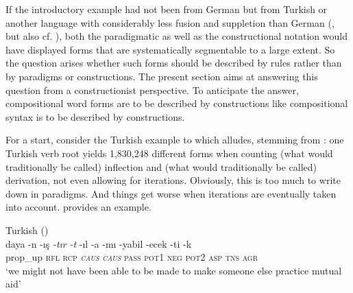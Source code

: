 \documentclass[output=paper]{langsci/langscibook}
\begin{document}
If the introductory example had not been from German but from Turkish or another language with considerably less fusion and suppletion than German (\citealt[4]{AikhenvaldDixon2017}, \citealt[334]{Dressler1985} but also cf. \citealt{Bacanlı2011}), both the paradigmatic as well as the constructional notation would have displayed forms that are systematically segmentable to a large extent. So the question arises whether such forms should be described by rules rather than by paradigms or constructions. The present section aims at answering this question from a constructionist perspective. To anticipate the answer, compositional word forms are to be described by constructions like compositional syntax is to be described by constructions.

\begin{sloppypar}
For a start, consider the Turkish example to which \citet[59]{Haspelmath2011} alludes, stemming from \citet[403]{Hankamer1989}: one Turkish verb root yields 1,830,248 different forms when counting (what would traditionally be called) inflection and (what would traditionally be called) derivation, not even allowing for iterations. Obviously, this is too much to write down in paradigms. And things get worse when iterations are eventually taken into account.  provides an example.
\end{sloppypar}\largerpage[-1]

\ea \label{ex:reiner:1}
{Turkish (\citealt[396, emphasis added]{Hankamer1989})}\\
\gll daya    {}-n  {}-ış  \textit{{}-tır}  \textit{{}-t}  {}-ıl  {}-a {}-mı  {}-yabil  {}-ecek  {}-ti  {}-k\\
     prop\_up    \textsc{rfl}  \textsc{rcp}  \textit{\textsc{caus}}  \textit{\textsc{caus}}  \textsc{pass}  \textsc{pot}1 \textsc{neg}  \textsc{pot}2  \textsc{asp}  \textsc{tns}  \textsc{agr}{\footnotemark}\\
\glt ‘we might not have been able to be made to make someone else practice mutual aid’
\z
{}
\end{document}
